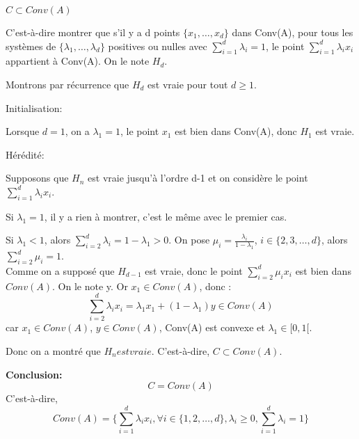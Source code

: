 \documentclass{article}
\begin{document}
\vspace{2em}
\textbf{\Large{$C \subset Conv(A)$}}\\
\par 
C'est-à-dire montrer que s'il y a d points $\{x_{1},\dots,x_{d}\}$ dans Conv(A), pour tous les  systèmes de $\{\lambda_{1},\dots,\lambda_{d}\}$ positives ou nulles avec $\sum\limits_{i=1}^{d}\lambda_{i}=1$, le point 
$\sum\limits_{i=1}^{d}\lambda_{i}x_{i}$ appartient à Conv(A). On le note $H_{d}$. \par
Montrons par récurrence que $H_{d}$ est vraie pour tout $d\geq 1$.\par
Initialisation:\par
Lorsque $d=1$, on a $\lambda_{1}=1$, le point $x_{1}$ est bien dans Conv(A), donc $H_{1}$ est vraie. \par

Hérédité:\par
Supposons que $H_{n}$ est vraie jusqu'à l'ordre d-1 et on considère le point $\sum\limits_{i=1}^{d}\lambda_{i}x_{i}$.\par
Si $\lambda_{1}=1$, il y a rien à montrer, c'est le même avec le premier cas.\par
Si $\lambda_{1} <1$, alors $\sum\limits_{i=2}^{d}\lambda_{i}=1-\lambda_{1}>0$. On pose 
$\mu_{i}=\frac{\lambda_{i}}{1-\lambda_{1}}$, $i \in \{2,3,\dots,d\}$, alors $\sum\limits_{i=2}^{d}\mu_{i}=1$.\\
Comme on a supposé que $H_{d-1}$ est vraie, donc le point $\sum\limits_{i=2}^{d}\mu_{i}x_{i}$ est bien dans $Conv(A)$. On le note y. Or $x_{1} \in Conv(A)$, donc :
\begin{equation}
    \sum\limits_{i=2}^{d}\lambda_{i}x_{i}=\lambda_{1}x_{1}+(1-\lambda_{1})y \in Conv(A)\nonumber
\end{equation}
car $x_{1} \in Conv(A)$, $y \in Conv(A)$, Conv(A) est convexe et $\lambda_{1} \in [0,1[$.\par
Donc on a montré que $H_{n} est vraie.$
C'est-à-dire, $C \subset Conv(A)$.\par

\vspace{2em}
\textbf{\Large{Conclusion:}}\\
\begin{equation}
    C=Conv(A)\nonumber
\end{equation}
C'est-à-dire,
\begin{equation}
    Conv(A)=\{\sum\limits_{i=1}^{d}\lambda_{i}x_{i}, \forall i \in \{1,2,\dots,d\},\lambda_{i}\geq0,\sum\limits_{i=1}^{d}\lambda_{i}=1\}\nonumber
\end{equation}
\end{document}
